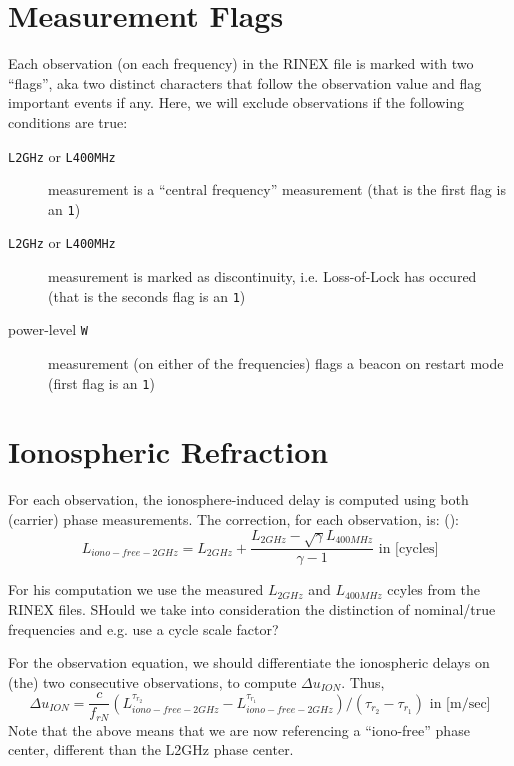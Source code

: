 \section{Measurement Flags}
\label{sec:measurement-flags}
Each observation (on each frequency) in the RINEX file is marked with two ``flags'', 
aka two distinct characters that follow the observation value and flag important 
events if any. Here, we will exclude observations if the following conditions are true:
\begin{description}
  \item[\texttt{L2GHz} or \texttt{L400MHz}] measurement is a ``central frequency'' 
  measurement (that is the first flag is an \texttt{1})
  \item[\texttt{L2GHz} or \texttt{L400MHz}] measurement is marked as discontinuity, 
  i.e. Loss-of-Lock has occured (that is the seconds flag is an \texttt{1})
  \item[power-level \texttt{W}] measurement (on either of the frequencies) flags 
  a beacon on restart mode (first flag is an \texttt{1})
\end{description}

\section{Ionospheric Refraction}
\label{sec:ionospheric-refraction}
For each observation, the ionosphere-induced delay is computed using both 
(carrier) phase measurements. The correction, for each observation, is: 
(\cite{lemoine-2016}):
\begin{equation}
  L_{iono-free-2GHz} = L_{2GHz} 
    + \frac{L_{2GHz} - \sqrt \gamma L_{400MHz}}{\gamma - 1} 
    \text{ in [cycles]}
\end{equation}

{\color{brown}For his computation we use the measured $L_{2GHz}$ and $L_{400MHz}$ 
ccyles from the RINEX files. SHould we take into consideration the distinction 
of nominal/true frequencies and e.g. use a cycle scale factor?}

For the observation equation, we should differentiate the ionospheric delays on 
(the) two consecutive observations, to compute $\Delta u_{ION}$. Thus,
\begin{equation}
  \Delta u_{ION} = \frac{c}{f_{rN}} \left( L_{iono-free-2GHz}^{\tau_{r_2}} 
    - L_{iono-free-2GHz}^{\tau_{r_1}} \right) / (\tau_{r_2} - \tau_{r_1})
    \text{ in [m/sec]}
\end{equation}
Note that the above means that we are now referencing a ``iono-free'' phase center, 
different than the L2GHz phase center.

